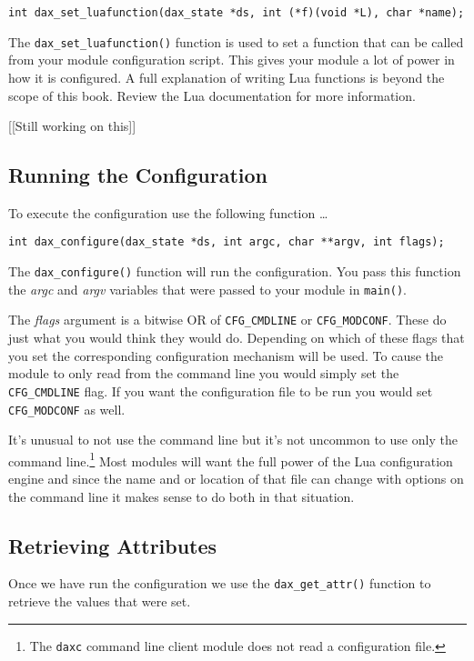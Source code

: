 \begin{verbatim}
int dax_set_luafunction(dax_state *ds, int (*f)(void *L), char *name);
\end{verbatim}

The \verb|dax_set_luafunction()|
function is used to set a function that can be called from your module
configuration script.  This gives your module a lot of power in how it is
configured.  A full explanation of writing Lua functions is beyond the scope of
this book.  Review the Lua documentation for more information.

[[Still working on this]]

\subsection{Running the Configuration}
To execute the configuration use the following function \ldots
\begin{verbatim}
int dax_configure(dax_state *ds, int argc, char **argv, int flags);
\end{verbatim}

The \verb|dax_configure()| function will run
the configuration.  You pass this function the \textit{argc} and \textit{argv}
variables that were passed to your module in \verb|main()|.

The \textit{flags} argument is a bitwise OR of \verb|CFG_CMDLINE| or 
\verb|CFG_MODCONF|.  These do just what you would think
they would do.  Depending on which of these flags that you set the corresponding
configuration mechanism will be used.  To cause the module to only read from the
command line you would simply set the \verb|CFG_CMDLINE| flag. If you want
the configuration file to be run you would set \verb|CFG_MODCONF| as well.

It's unusual to not use the command line but it's not uncommon to use only
the command line.\footnote{The \verb|daxc| command line client module does not read
a configuration file.}  Most modules will want the full power of the Lua
configuration engine and since the name and or location of that file can change
with options on the command line it makes sense to do both in that situation.

\subsection{Retrieving Attributes}

Once we have run the configuration we use the
\verb|dax_get_attr()| function to retrieve the
values that were set.

